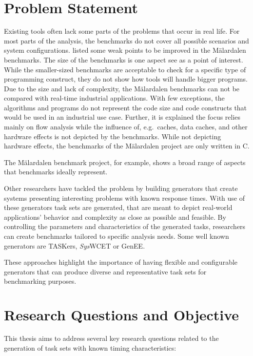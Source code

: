 \section{Problem Statement}\label{sec:problem_statement}
Existing tools often lack some parts of the problems that occur in real life.
For most parts of the analysis, the benchmarks do not cover all possible scenarios and system configurations.
\textcite{gustafssonMalardalenWCETBenchmarks2012} listed some weak points to be improved in the Mälardalen benchmarks.
The size of the benchmarks is one aspect \citeauthor{gustafssonMalardalenWCETBenchmarks2012} see as a point of interest.
While the smaller-sized benchmarks are acceptable to check for a specific type of programming construct, they do not show how tools will handle bigger programs.
Due to the size and lack of complexity, the Mälardalen benchmarks can not be compared with real-time industrial applications.
With few exceptions, the algorithms and programs do not represent the code size and code constructs that would be used in an industrial use case.
Further, it is explained the focus relies mainly on flow analysis while the influence of, e.g.~caches, data caches, and other hardware effects is not depicted by the benchmarks.
While not depicting hardware effects, the benchmarks of the Mälardalen project are only written in C.

The Mälardalen benchmark project, for example, shows a broad range of aspects that benchmarks ideally represent.

Other researchers have tackled the problem by building generators that create systems presenting interesting problems with known response times. 
With use of these generators task sets are generated, that are meant to  depict real-world applications' behavior and complexity as close as possible and feasible. 
By controlling the parameters and characteristics of the generated tasks, researchers can create benchmarks tailored to specific analysis needs.
Some well known generators are TASKers\cite{eichlerTASKersWholeSystemGenerator2018}, \textit{Sys}WCET\cite{dietrichSysWCETWholeSystemResponseTime} or GenEE\cite{eichlerGENEEBenchmarkGenerator2019}.

These approaches highlight the importance of having flexible and configurable generators that can produce diverse and representative task sets for benchmarking purposes.

\section{Research Questions and Objective}\label{sec:research_questions_objectives}
This thesis aims to address several key research questions related to the generation of task sets with known timing characteristics:

